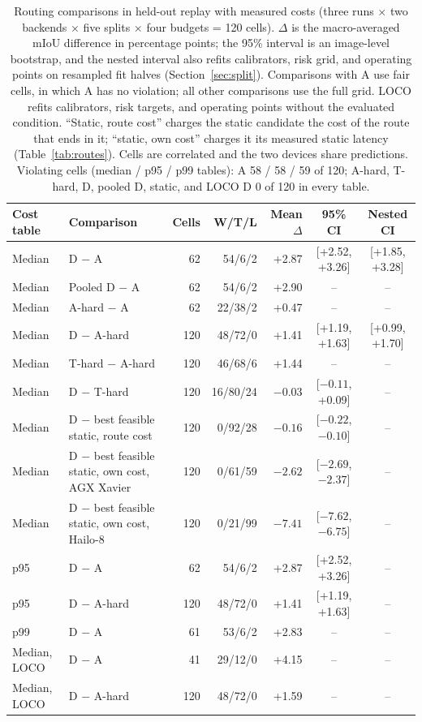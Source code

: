\documentclass[a4paper,5p]{elsarticle}
\newcommand{\miou}{mIoU}
\begin{document}
\begin{table}[!t]
\centering
\caption{Routing comparisons in held-out replay with measured costs (three runs $\times$ two backends $\times$ five splits $\times$ four budgets = 120 cells). $\Delta$ is the macro-averaged \miou{} difference in percentage points; the 95\% interval is an image-level bootstrap, and the nested interval also refits calibrators, risk grid, and operating points on resampled fit halves (Section~\ref{sec:split}). Comparisons with A use fair cells, in which A has no violation; all other comparisons use the full grid. LOCO refits calibrators, risk targets, and operating points without the evaluated condition. ``Static, route cost'' charges the static candidate the cost of the route that ends in it; ``static, own cost'' charges it its measured static latency (Table~\ref{tab:routes}). Cells are correlated and the two devices share predictions. Violating cells (median / p95 / p99 tables): A 58 / 58 / 59 of 120; A-hard, T-hard, D, pooled D, static, and LOCO D 0 of 120 in every table.}
\label{tab:routerfinal}
\footnotesize
\setlength{\tabcolsep}{4pt}
\begin{tabular}{@{}llrrrcc@{}}
\toprule
Cost table & Comparison & Cells & W/T/L & Mean $\Delta$ & 95\% CI & Nested CI \\
\midrule
Median & D $-$ A & 62 & 54/6/2 & +2.87 & [+2.52, +3.26] & [+1.85, +3.28] \\
Median & Pooled D $-$ A & 62 & 54/6/2 & +2.90 & -- & -- \\
Median & A-hard $-$ A & 62 & 22/38/2 & +0.47 & -- & -- \\
Median & D $-$ A-hard & 120 & 48/72/0 & +1.41 & [+1.19, +1.63] & [+0.99, +1.70] \\
Median & T-hard $-$ A-hard & 120 & 46/68/6 & +1.44 & -- & -- \\
Median & D $-$ T-hard & 120 & 16/80/24 & $-0.03$ & [$-0.11$, +0.09] & -- \\
Median & D $-$ best feasible static, route cost & 120 & 0/92/28 & $-0.16$ & [$-0.22$, $-0.10$] & -- \\
Median & D $-$ best feasible static, own cost, AGX Xavier & 120 & 0/61/59 & $-2.62$ & [$-2.69$, $-2.37$] & -- \\
Median & D $-$ best feasible static, own cost, Hailo-8 & 120 & 0/21/99 & $-7.41$ & [$-7.62$, $-6.75$] & -- \\
\midrule
p95 & D $-$ A & 62 & 54/6/2 & +2.87 & [+2.52, +3.26] & -- \\
p95 & D $-$ A-hard & 120 & 48/72/0 & +1.41 & [+1.19, +1.63] & -- \\
p99 & D $-$ A & 61 & 53/6/2 & +2.83 & -- & -- \\
\midrule
Median, LOCO & D $-$ A & 41 & 29/12/0 & +4.15 & -- & -- \\
Median, LOCO & D $-$ A-hard & 120 & 48/72/0 & +1.59 & -- & -- \\
\bottomrule
\end{tabular}
\end{table}
\end{document}
